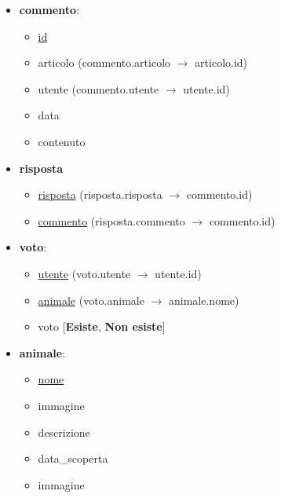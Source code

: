 \begin{itemize}
        \item \textbf{commento}:
        \begin{itemize}
            \item \underline{id}
            \item articolo (commento.articolo $\rightarrow$ articolo.id)
            \item utente (commento.utente $\rightarrow$ utente.id)
            \item data
            \item contenuto
        \end{itemize}

        \item \textbf{risposta}
        \begin{itemize}
            \item \underline{risposta} (risposta.risposta $\rightarrow$ commento.id)
            \item \underline{commento} (risposta.commento $\rightarrow$ commento.id)
        \end{itemize}

        \item \textbf{voto}:
        \begin{itemize}
            \item \underline{utente} (voto.utente $\rightarrow$ utente.id)
            \item \underline{animale} (voto.animale $\rightarrow$ animale.nome)
            \item voto [\textbf{Esiste}, \textbf{Non esiste}]
        \end{itemize}

        \item \textbf{animale}:
        \begin{itemize}
            \item \underline{nome} 
            \item immagine
            \item descrizione
            \item data\_scoperta
            \item immagine
        \end{itemize}
    \end{itemize}